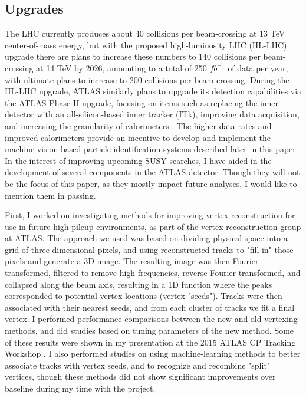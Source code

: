 \documentclass{article}
\begin{document}

\subsection*{Upgrades}

The LHC currently produces about 40 collisions per beam-crossing at 13 TeV center-of-mass energy, but with the proposed high-luminosity LHC (HL-LHC) upgrade there are plans to increase these numbers to 140 collisions per beam-crossing at 14 TeV by 2026, amounting to a total of 250 $fb^{-1}$ of data per year, with ultimate plans to increase to 200 collisions per beam-crossing. During the HL-LHC upgrade, ATLAS similarly plans to upgrade its detection capabilities via the ATLAS Phase-II upgrade, focusing on items such as replacing the inner detector with an all-silicon-based inner tracker (ITk), improving data acquisition, and increasing the granularity of calorimeters \cite{ATLAS_phaseII}. The higher data rates and improved calorimeters provide an incentive to develop and implement the machine-vision based particle identification systems described later in this paper. In the interest of improving upcoming SUSY searches, I have aided in the development of several components in the ATLAS detector. Though they will not be the focus of this paper, as they mostly impact future analyses, I would like to mention them in passing.

First, I worked on investigating methods for improving vertex reconstruction for use in future high-pileup environments, as part of the vertex reconstruction group at ATLAS. The approach we used was based on dividing physical space into a grid of three-dimensional pixels, and using reconstructed tracks to "fill in" those pixels and generate a 3D image. The resulting image was then Fourier transformed, filtered to remove high frequencies, reverse Fourier transformed, and collapsed along the beam axis, resulting in a 1D function where the peaks corresponded to potential vertex locations (vertex "seeds"). Tracks were then associated with their nearest seeds, and from each cluster of tracks we fit a final vertex. I performed performance comparisons between the new and old vertexing methods, and did studies based on tuning parameters of the new method. Some of these results were shown in my presentation at the 2015 ATLAS CP Tracking Workshop \cite{vertex}. I also performed studies on using machine-learning methods to better associate tracks with vertex seeds, and to recognize and recombine "split" vertices, though these methods did not show significant improvements over baseline during my time with the project.
\end{document}
